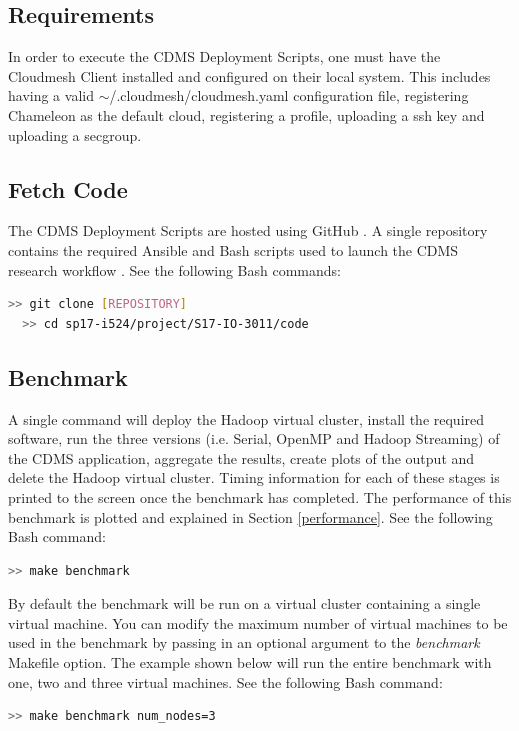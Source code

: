 \documentclass[9pt,twocolumn,twoside]{../../styles/osajnl}
\begin{document}
\subsection{Requirements} \label{req}
In order to execute the CDMS Deployment Scripts, one must have the
Cloudmesh Client installed and configured on their local system. This
includes having a valid $\sim$/.cloudmesh/cloudmesh.yaml configuration
file, registering Chameleon as the default cloud, registering a
profile, uploading a ssh key and uploading a secgroup.

\subsection{Fetch Code} \label{git}
The CDMS Deployment Scripts are hosted using GitHub
\cite{www-github}. A single repository contains the required Ansible
and Bash scripts used to launch the CDMS research workflow
\cite{www-github-i524}.
\noindent See the following Bash commands:
\begin{lstlisting}[language=bash]
  >> git clone [REPOSITORY]
  >> cd sp17-i524/project/S17-IO-3011/code
\end{lstlisting}

\subsection{Benchmark} \label{benchmark-info}
A single command will deploy the Hadoop virtual cluster, install the
required software, run the three versions (i.e. Serial, OpenMP and
Hadoop Streaming) of the CDMS application, aggregate the results,
create plots of the output and delete the Hadoop virtual
cluster. Timing information for each of these stages is printed to the
screen once the benchmark has completed. The performance of this
benchmark is plotted and explained in Section \ref{performance}.
\noindent See the following Bash command:
\begin{lstlisting}[language=bash]
  >> make benchmark
\end{lstlisting}
By default the benchmark will be run on a virtual cluster containing a
single virtual machine. You can modify the maximum number of virtual
machines to be used in the benchmark by passing in an optional
argument to the \emph{benchmark} Makefile option. The example shown
below will run the entire benchmark with one, two and three virtual
machines.
\noindent See the following Bash command:
\begin{lstlisting}[language=bash]
  >> make benchmark num_nodes=3
\end{lstlisting}
\end{document}
